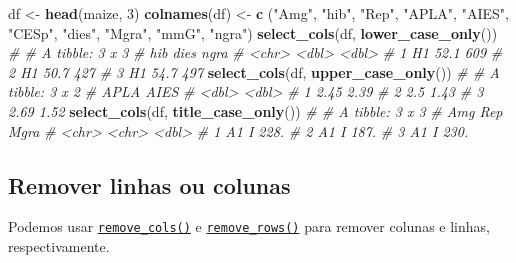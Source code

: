 \documentclass[
]{book}
\newenvironment{Shaded}{\begin{snugshade}}{\end{snugshade}}
\newcommand{\CommentTok}[1]{\textcolor[rgb]{0.56,0.35,0.01}{\textit{#1}}}
\newcommand{\DecValTok}[1]{\textcolor[rgb]{0.00,0.00,0.81}{#1}}
\newcommand{\KeywordTok}[1]{\textcolor[rgb]{0.13,0.29,0.53}{\textbf{#1}}}
\newcommand{\NormalTok}[1]{#1}
\newcommand{\StringTok}[1]{\textcolor[rgb]{0.31,0.60,0.02}{#1}}
\begin{document}
\begin{Shaded}
\begin{Highlighting}[]
\NormalTok{df <-}\StringTok{ }\KeywordTok{head}\NormalTok{(maize, }\DecValTok{3}\NormalTok{)}
\KeywordTok{colnames}\NormalTok{(df) <-}\StringTok{ }\KeywordTok{c}\NormalTok{ (}\StringTok{"Amg"}\NormalTok{, }\StringTok{"hib"}\NormalTok{, }\StringTok{"Rep"}\NormalTok{, }\StringTok{"APLA"}\NormalTok{, }\StringTok{"AIES"}\NormalTok{, }\StringTok{"CESp"}\NormalTok{, }\StringTok{"dies"}\NormalTok{, }\StringTok{"Mgra"}\NormalTok{, }\StringTok{"mmG"}\NormalTok{, }\StringTok{"ngra"}\NormalTok{)}
\KeywordTok{select_cols}\NormalTok{(df, }\KeywordTok{lower_case_only}\NormalTok{())}
\CommentTok{# # A tibble: 3 x 3}
\CommentTok{#   hib    dies  ngra}
\CommentTok{#   <chr> <dbl> <dbl>}
\CommentTok{# 1 H1     52.1   609}
\CommentTok{# 2 H1     50.7   427}
\CommentTok{# 3 H1     54.7   497}
\KeywordTok{select_cols}\NormalTok{(df, }\KeywordTok{upper_case_only}\NormalTok{())}
\CommentTok{# # A tibble: 3 x 2}
\CommentTok{#    APLA  AIES}
\CommentTok{#   <dbl> <dbl>}
\CommentTok{# 1  2.45  2.39}
\CommentTok{# 2  2.5   1.43}
\CommentTok{# 3  2.69  1.52}
\KeywordTok{select_cols}\NormalTok{(df, }\KeywordTok{title_case_only}\NormalTok{())}
\CommentTok{# # A tibble: 3 x 3}
\CommentTok{#   Amg   Rep    Mgra}
\CommentTok{#   <chr> <chr> <dbl>}
\CommentTok{# 1 A1    I      228.}
\CommentTok{# 2 A1    I      187.}
\CommentTok{# 3 A1    I      230.}
\end{Highlighting}
\end{Shaded}


\hypertarget{remover-linhas-ou-colunas}{%
\subsection{Remover linhas ou colunas}\label{remover-linhas-ou-colunas}}

Podemos usar \href{https://tiagoolivoto.github.io/metan/reference/utils_rows_cols.html}{\texttt{remove\_cols()}} e \href{https://tiagoolivoto.github.io/metan/\%20reference\%20/\%20utils_rows_cols.html}{\texttt{remove\_rows()}} para remover colunas e linhas, respectivamente.
\end{document}
